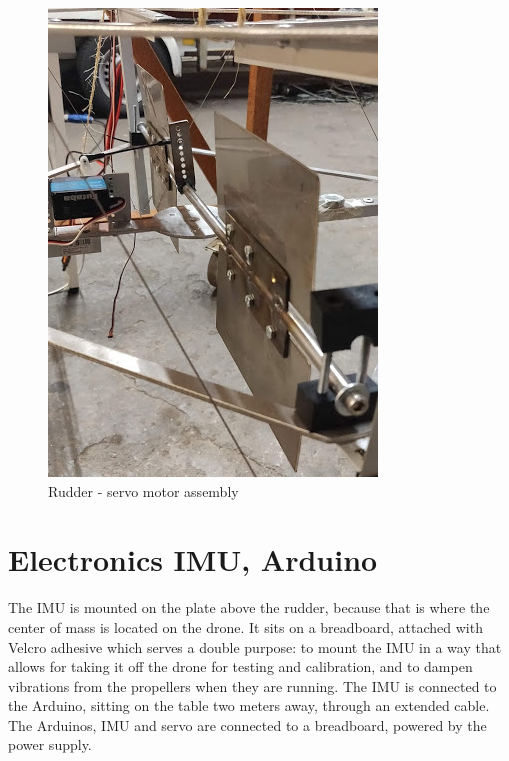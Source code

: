 \begin{figure}[h!]
    \centering
    \includegraphics[scale=0.8]{graphics/Drone/rudder.png}
    \caption{Rudder - servo motor assembly}
     \label{fig:Rudder - servo motor assembly}
\end{figure} 

 
 \section{Electronics IMU, Arduino}
 
The IMU is mounted on the plate above the rudder, because that is where the center of mass is located on the drone. 
It sits on a breadboard, attached with Velcro adhesive which serves a double purpose: to mount the IMU in a way that allows for taking it off the drone for testing and calibration, and to dampen vibrations from the propellers when they are running.
The IMU is connected to the Arduino, sitting on the table two meters away, through an extended cable. 
The Arduinos, IMU and servo are connected to a breadboard, powered by the power supply. 

